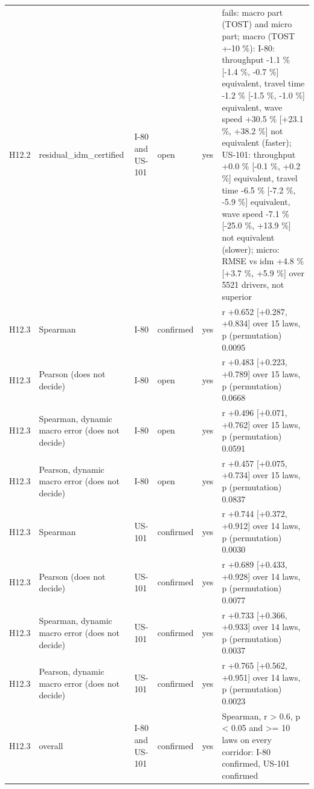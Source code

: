 \begin{table}[htbp]
\begin{tabular}{llllll}
H12.2 & residual\_idm\_certified & I-80 and US-101 & open & yes & fails: macro part (TOST) and micro part; macro (TOST +-10 \%): I-80: throughput -1.1 \% [-1.4 \%, -0.7 \%] equivalent, travel time -1.2 \% [-1.5 \%, -1.0 \%] equivalent, wave speed +30.5 \% [+23.1 \%, +38.2 \%] not equivalent (faster); US-101: throughput +0.0 \% [-0.1 \%, +0.2 \%] equivalent, travel time -6.5 \% [-7.2 \%, -5.9 \%] equivalent, wave speed -7.1 \% [-25.0 \%, +13.9 \%] not equivalent (slower); micro: RMSE vs idm +4.8 \% [+3.7 \%, +5.9 \%] over 5521 drivers, not superior \\
H12.3 & Spearman & I-80 & confirmed & yes & r +0.652 [+0.287, +0.834] over 15 laws, p (permutation) 0.0095 \\
H12.3 & Pearson (does not decide) & I-80 & open & yes & r +0.483 [+0.223, +0.789] over 15 laws, p (permutation) 0.0668 \\
H12.3 & Spearman, dynamic macro error (does not decide) & I-80 & open & yes & r +0.496 [+0.071, +0.762] over 15 laws, p (permutation) 0.0591 \\
H12.3 & Pearson, dynamic macro error (does not decide) & I-80 & open & yes & r +0.457 [+0.075, +0.734] over 15 laws, p (permutation) 0.0837 \\
H12.3 & Spearman & US-101 & confirmed & yes & r +0.744 [+0.372, +0.912] over 14 laws, p (permutation) 0.0030 \\
H12.3 & Pearson (does not decide) & US-101 & confirmed & yes & r +0.689 [+0.433, +0.928] over 14 laws, p (permutation) 0.0077 \\
H12.3 & Spearman, dynamic macro error (does not decide) & US-101 & confirmed & yes & r +0.733 [+0.366, +0.933] over 14 laws, p (permutation) 0.0037 \\
H12.3 & Pearson, dynamic macro error (does not decide) & US-101 & confirmed & yes & r +0.765 [+0.562, +0.951] over 14 laws, p (permutation) 0.0023 \\
H12.3 & overall & I-80 and US-101 & confirmed & yes & Spearman, r \textgreater{} 0.6, p \textless{} 0.05 and \textgreater{}= 10 laws on every corridor: I-80 confirmed, US-101 confirmed \\
\bottomrule
\end{tabular}
\end{table}
